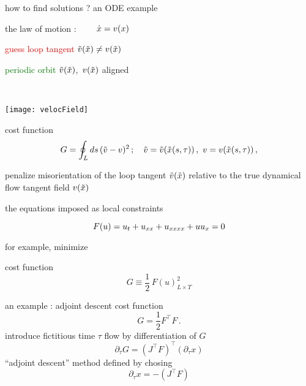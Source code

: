 \begin{frame}{how to find solutions ? an ODE example}
\begin{center}
the law of motion : $\qquad \dot{x} = v(x)$
\begin{minipage}[c]{0.55\textwidth}
\textcolor{red}{guess loop tangent}
$\tilde{v}(\tilde{x})
	\neq
v(\tilde{x})$

	\vskip 0.5cm

\textcolor{green}{periodic orbit}
$\tilde{v}(\tilde{x})$,~$v(\tilde{x})$
aligned
\end{minipage}%
~~~~~~~\begin{minipage}[c]{0.40\textwidth}
	\begin{center}
	\texttt{[image: velocField]}
	\end{center}
\end{minipage}
\end{center}
\begin{block}{cost function}%
\[
G =
            \oint_L ds\,(\tilde{v}-v)^2
    \,;\quad
    \tilde{v} = \tilde{v}(\tilde{x}(s,\tau))\,,\,\,
    v = v(\tilde{x}(s,\tau))
\,,
\]
\end{block}
\bigskip

penalize%
 misorientation of the loop tangent
$\tilde{v}(\tilde{x})$
relative to the true dynamical flow tangent field $v(\tilde{x})$
\end{frame}

\begin{frame}{the equations imposed as local constraints}
\begin{block}{\KSe}
\[
F(u) = u_t + u_{x x} + u_{x x x x} + u u_{x} = 0
\]
\end{block}
\bigskip\bigskip
for example, minimize
\begin{block}{cost function}
\[
G \equiv \frac{1}{2} \,F(u)^2_{L \times T}
\]
\end{block}
\end{frame}

\begin{frame}{an example : adjoint descent}
cost function
\[
  G = \frac{1}{2} F^{\top}F
  \,.
\]
introduce fictitious time  $\tau$ flow by differentiation of $G$
\[
  \partial_{\tau}G = (J^{\top}F)^{\top}(\partial_{\tau}{x})
\]
  ``adjoint descent'' method defined by chosing
\[
  \partial_{\tau}{x} = -(J^{\top}F)
\]

\end{frame}


